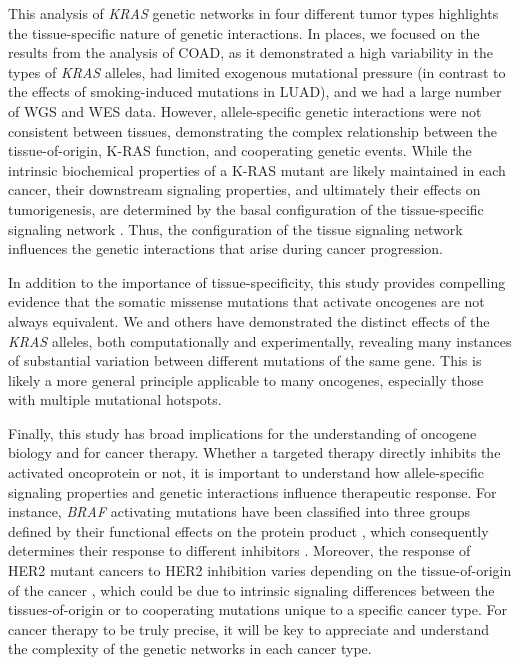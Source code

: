 \documentclass[english, 10pt, letterpaper]{article}
\newcommand{\KRAS}{\emph{KRAS}}
\newcommand{\kras}{K-RAS}
\begin{document}
This analysis of \KRAS{} genetic networks in four different tumor types highlights the tissue-specific nature of genetic interactions. 
In places, we focused on the results from the analysis of COAD, as it demonstrated a high variability in the types of \KRAS{} alleles, had limited exogenous mutational pressure (in contrast to the effects of smoking-induced mutations in LUAD), and we had a large number of WGS and WES data.
However, allele-specific genetic interactions were not consistent between tissues, demonstrating the complex relationship between the tissue-of-origin, \kras{} function, and cooperating genetic events.
While the intrinsic biochemical properties of a \kras{} mutant are likely maintained in each cancer, their downstream signaling properties, and ultimately their effects on tumorigenesis, are determined by the basal configuration of the tissue-specific signaling network \cite{Brubaker2019}.
Thus, the configuration of the tissue signaling network influences the genetic interactions that arise during cancer progression.


In addition to the importance of tissue-specificity, this study provides compelling evidence that the somatic missense mutations that activate oncogenes are not always equivalent.
We and others have demonstrated the distinct effects of the \KRAS{} alleles, both computationally and experimentally, revealing many instances of substantial variation between different mutations of the same gene.
This is likely a more general principle applicable to many oncogenes, especially those with multiple mutational hotspots.

Finally, this study has broad implications for the understanding of oncogene biology and for cancer therapy.
Whether a targeted therapy directly inhibits the activated oncoprotein or not, it is important to understand how allele-specific signaling properties and genetic interactions influence therapeutic response.
For instance, \emph{BRAF} activating mutations have been classified into three groups defined by their functional effects on the protein product \cite{Yao2015BRAFInhibition., Yao2017TumoursRAS.}, which consequently determines their response to different inhibitors \cite{Dagogo-Jack2019, Bracht2019BRAFRationale.}.
Moreover, the response of HER2 mutant cancers to HER2 inhibition varies depending on the tissue-of-origin of the cancer \cite{Hyman2018HERCancers}, which could be due to intrinsic signaling differences between the tissues-of-origin or to cooperating mutations unique to a specific cancer type. 
For cancer therapy to be truly precise, it will be key to appreciate and understand the complexity of the genetic networks in each cancer type.
\end{document}
